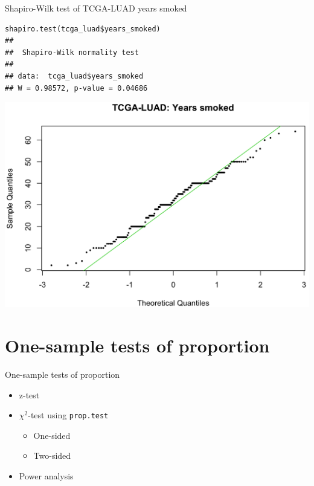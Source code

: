 \documentclass[12pt, t, xcolor=dvipsnames]{beamer}
\newcommand{\code}[1]{\colorbox{codegray}{\textcolor{black!95}{\texttt{#1}}}}
\begin{document}
\begin{frame}[fragile]{Shapiro-Wilk test of TCGA-LUAD years smoked}
\begin{verbatim}
shapiro.test(tcga_luad$years_smoked)
## 
##  Shapiro-Wilk normality test
## 
## data:  tcga_luad$years_smoked
## W = 0.98572, p-value = 0.04686
\end{verbatim}
\includegraphics[height=0.6\textheight, keepaspectratio]{qqys}
\end{frame}



\section{One-sample tests of proportion}

\begin{frame}{One-sample tests of proportion}
\begin{itemize}
  \item z-test
  \item $\chi^2$-test using \code{prop.test}
  \begin{itemize}
    \item One-sided
    \item Two-sided
  \end{itemize}
  \item Power analysis
  
\end{itemize}

\end{frame}
\end{document}
